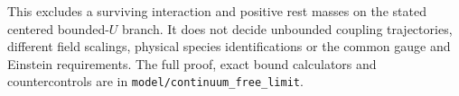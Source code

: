 This excludes a surviving interaction and positive rest masses on the
stated centered bounded-$U$ branch. It does not decide unbounded coupling
trajectories, different field scalings, physical species identifications
or the common gauge and Einstein requirements. The full proof, exact
bound calculators and countercontrols are in
\texttt{model/continuum\_free\_limit}.
